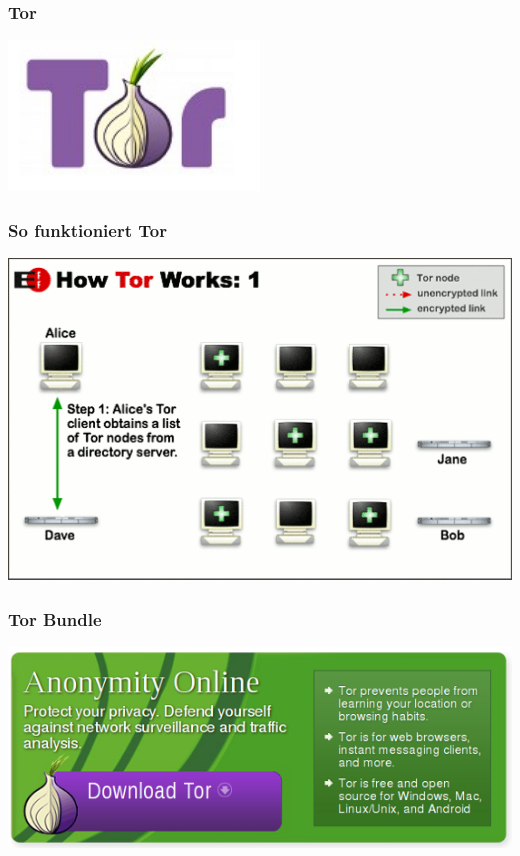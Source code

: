 
  \begin{frame}
    \frametitle{Tor}
    \includegraphics[width=0.5\textwidth, height=0.5\textheight]{../../img/tor.png}
  \end{frame}
  
  \begin{frame}
    \frametitle{So funktioniert Tor}
    \includegraphics[height=0.7\textheight]{../../img/tor1.png}
  \end{frame}
  
  \begin{frame}
    \frametitle{Tor Bundle}
    \includegraphics[width=1\textwidth, height=0.7\textheight]{../../img/tor_bundle.png}      
  \end{frame}

